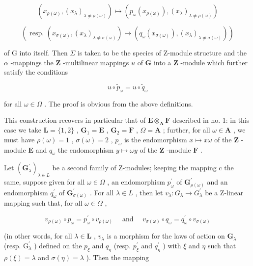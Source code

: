\[
\left(x _ {\rho (\omega)}, \left(x _ {\lambda}\right) _ {\lambda \neq \rho (\omega)}\right) \mapsto \left(p _ {\omega} \left(x _ {\rho (\omega)}\right), \left(x _ {\lambda}\right) _ {\lambda \neq \rho (\omega)}\right)
\]

\[
\left(\text { resp. } \left(x _ {\sigma (\omega)}, \left(x _ {\lambda}\right) _ {\lambda \neq \sigma (\omega)}\right) \mapsto \left(q _ {\omega} (x _ {\sigma (\omega)}), \left(x _ {\lambda}\right) _ {\lambda \neq \sigma (\omega)}\right)\right)
\]

of G into itself. Then \(\Sigma\) is taken to be the species of Z-module structure and the \(\alpha\) -mappings the \(\mathbf{Z}\) -multilinear mappings \(u\) of \(\mathbf{G}\) into a \(\mathbf{Z}\) -module which further satisfy the conditions

\[
u \circ \tilde {p} _ {\omega} = u \circ \tilde {q} _ {\omega}\tag{26}
\]

for all \(\omega \in \Omega\) . The proof is obvious from the above definitions.

This construction recovers in particular that of \(\mathbf{E} \otimes_{\mathbf{A}} \mathbf{F}\) described in no. 1: in this case we take \(\mathbf{L} = \{1, 2\}\) , \(\mathbf{G}_1 = \mathbf{E}\) , \(\mathbf{G}_2 = \mathbf{F}\) , \(\Omega = \mathbf{A}\) ; further, for all \(\omega \in \mathbf{A}\) , we must have \(\rho(\omega) = 1\) , \(\sigma(\omega) = 2\) , \(p_\omega\) is the endomorphism \(x \mapsto x\omega\) of the \(\mathbf{Z}\) -module \(\mathbf{E}\) and \(q_\omega\) the endomorphism \(y \mapsto \omega y\) of the \(\mathbf{Z}\) -module \(\mathbf{F}\) .

Let \((\mathbf{G}_{\lambda}^{\prime})_{\lambda \in L}\) be a second family of Z-modules; keeping the mapping c the same, suppose given for all \(\omega \in \Omega\) , an endomorphism \(p_{\omega}^{\prime}\) of \(\mathbf{G}_{\rho(\omega)}^{\prime}\) and an endomorphism \(q_{\omega}^{\prime}\) of \(\mathbf{G}_{\sigma(\omega)}^{\prime}\) . For all \(\lambda \in L\) , then let \(v_{\lambda}: G_{\lambda} \to G_{\lambda}^{\prime}\) be a Z-linear mapping such that, for all \(\omega \in \Omega\) ,

\[
v _ {\rho (\omega)} \circ p _ {\omega} = p _ {\omega} ^ {\prime} \circ v _ {\rho (\omega)} \quad \text { and } \quad v _ {\sigma (\omega)} \circ q _ {\omega} = q _ {\omega} ^ {\prime} \circ v _ {\sigma (\omega)}\tag{27}
\]

(in other words, for all \(\lambda \in \mathbf{L}\) , \(v_{\lambda}\) is a morphism for the laws of action on \(\mathbf{G}_{\lambda}\) (resp. \(\mathrm{G}_{\lambda}^{\prime}\) ) defined on the \(p_{\xi}\) and \(q_{\eta}\) (resp. \(p_{\xi}^{\prime}\) and \(q_{\eta}^{\prime}\) ) with \(\xi\) and \(\eta\) such that \(\rho(\xi) = \lambda\) and \(\sigma(\eta) = \lambda\) ). Then the mapping

